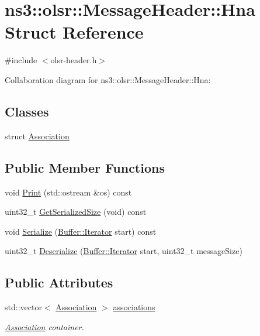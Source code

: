 \hypertarget{structns3_1_1olsr_1_1MessageHeader_1_1Hna}{}\section{ns3\+:\+:olsr\+:\+:Message\+Header\+:\+:Hna Struct Reference}
\label{structns3_1_1olsr_1_1MessageHeader_1_1Hna}


{\ttfamily \#include $<$olsr-\/header.\+h$>$}



Collaboration diagram for ns3\+:\+:olsr\+:\+:Message\+Header\+:\+:Hna\+:
\subsection*{Classes}
\begin{DoxyCompactItemize}
\item 
struct \hyperlink{structns3_1_1olsr_1_1MessageHeader_1_1Hna_1_1Association}{Association}
\end{DoxyCompactItemize}
\subsection*{Public Member Functions}
\begin{DoxyCompactItemize}
\item 
void \hyperlink{structns3_1_1olsr_1_1MessageHeader_1_1Hna_ab142a44df8504af398ed51a763f59915}{Print} (std\+::ostream \&os) const 
\item 
uint32\+\_\+t \hyperlink{structns3_1_1olsr_1_1MessageHeader_1_1Hna_ab5a823fa659e516b9666e263261e2b46}{Get\+Serialized\+Size} (void) const 
\item 
void \hyperlink{structns3_1_1olsr_1_1MessageHeader_1_1Hna_abcba618ae40d0350167a9fad9a679067}{Serialize} (\hyperlink{classns3_1_1Buffer_1_1Iterator}{Buffer\+::\+Iterator} start) const 
\item 
uint32\+\_\+t \hyperlink{structns3_1_1olsr_1_1MessageHeader_1_1Hna_a2433b9be3fa333d728193de36bc87334}{Deserialize} (\hyperlink{classns3_1_1Buffer_1_1Iterator}{Buffer\+::\+Iterator} start, uint32\+\_\+t message\+Size)
\end{DoxyCompactItemize}
\subsection*{Public Attributes}
\begin{DoxyCompactItemize}
\item 
std\+::vector$<$ \hyperlink{structns3_1_1olsr_1_1MessageHeader_1_1Hna_1_1Association}{Association} $>$ \hyperlink{structns3_1_1olsr_1_1MessageHeader_1_1Hna_a3989e2a5026258e7cbde6d7795aa9c9f}{associations}
\begin{DoxyCompactList}\small\item\em \hyperlink{structns3_1_1olsr_1_1MessageHeader_1_1Hna_1_1Association}{Association} container. \end{DoxyCompactList}\end{DoxyCompactItemize}


